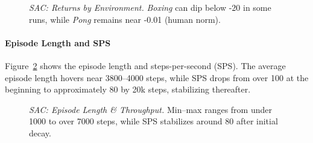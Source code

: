 \begin{figure}
	\centering
	\quad
	\caption{\emph{SAC: Returns by Environment.} \emph{Boxing} can dip below -20 in some runs, while \emph{Pong} remains near -0.01 (human norm).}
	\label{fig:sac_returns_pergame}
\end{figure}

\paragraph{Episode Length and SPS}
Figure~\ref{fig:sac_epilen_sps} shows the episode length and steps-per-second (SPS). The average episode length hovers near 3800–4000 steps, while SPS drops from over 100 at the beginning to approximately 80 by 20k steps, stabilizing thereafter.

\begin{figure}
	\centering
	\quad
	\caption{\emph{SAC: Episode Length \& Throughput.} Min–max ranges from under 1000 to over 7000 steps, while SPS stabilizes around 80 after initial decay.}
	\label{fig:sac_epilen_sps}
\end{figure}

